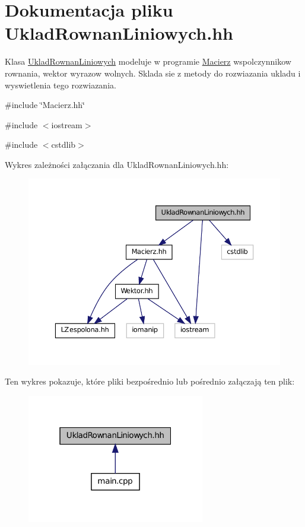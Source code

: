 \hypertarget{_uklad_rownan_liniowych_8hh}{
\section{Dokumentacja pliku UkladRownanLiniowych.hh}
\label{_uklad_rownan_liniowych_8hh}
}


Klasa \hyperlink{class_uklad_rownan_liniowych}{UkladRownanLiniowych} modeluje w programie \hyperlink{class_macierz}{Macierz} wspolczynnikow rownania, wektor wyrazow wolnych. Sklada sie z metody do rozwiazania ukladu i wyswietlenia tego rozwiazania.  


{\ttfamily \#include \char`\"{}Macierz.hh\char`\"{}}\par
{\ttfamily \#include $<$iostream$>$}\par
{\ttfamily \#include $<$cstdlib$>$}\par
Wykres zależności załączania dla UkladRownanLiniowych.hh:\nopagebreak
\begin{figure}[H]
\begin{center}
\leavevmode
\includegraphics[width=373pt]{_uklad_rownan_liniowych_8hh__incl}
\end{center}
\end{figure}
Ten wykres pokazuje, które pliki bezpośrednio lub pośrednio załączają ten plik:\nopagebreak
\begin{figure}[H]
\begin{center}
\leavevmode
\includegraphics[width=220pt]{_uklad_rownan_liniowych_8hh__dep__incl}
\end{center}
\end{figure}
